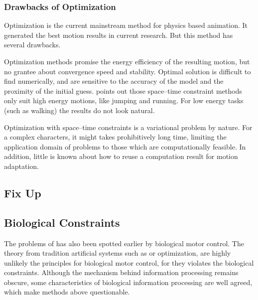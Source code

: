 \subsubsection*{Drawbacks of Optimization}
Optimization is the current mainstream method for physics based animation.
It generated the best motion results in current research.
But this method has several drawbacks.

\begin{itemize}
Optimization methods promise the energy efficiency of the resulting motion, but no grantee about convergence speed and stability.
Optimal solution is difficult to find numerically, and are sensitive to the accuracy of the model and the proximity of the initial guess.
\citet{Liu2005} points out those space–time constraint methods only suit high energy motions, like jumping and running.
For low energy tasks (such as walking) the results do not look natural.

Optimization with space–time constraints is a variational problem by nature. 
For a complex characters, it might takes  prohibitively long time, limiting the application domain of problems to those which are computationally feasible. 
In addition, little is known about how to reuse a computation result for motion adaptation.
\end{itemize}


\subsection{Fix Up}




\subsection{Biological Constraints}
The problems of \cms has also been spotted earlier by biological motor control.
The theory from tradition artificial systems such as \pd or optimization, are highly unlikely the principles for biological motor control, for they  violates the biological constraints.
Although the mechanism behind information processing remains obscure, some characteristics of biological information processing are well agreed, which make  \cms methods above questionable\citep{Glynn2003}. 
  
